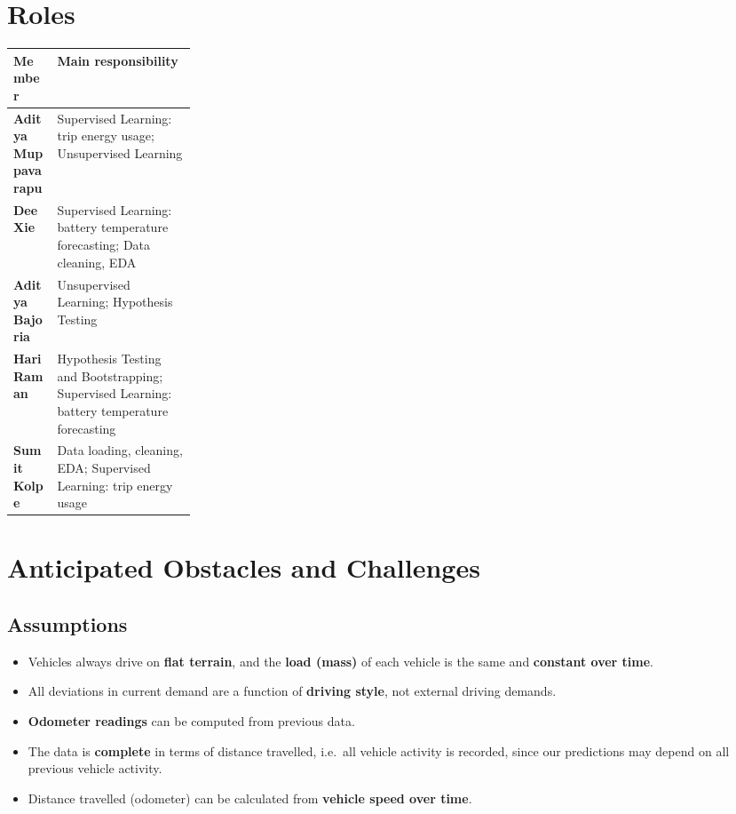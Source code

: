 \documentclass[11pt,letterpaper]{article}
\begin{document}
\section{Roles}

\begin{center}
\renewcommand{\arraystretch}{1.3}
\begin{tabularx}{\linewidth}{|>{\bfseries}p{0.24\linewidth}|>{\raggedright\arraybackslash}X|}
  \hline
  Member & \textbf{Main responsibility} \\
  \hline
  Aditya Muppavarapu & Supervised Learning: trip energy usage; Unsupervised Learning \\
  \hline
  Dee Xie & Supervised Learning: battery temperature forecasting; Data cleaning, EDA \\
  \hline
  Aditya Bajoria & Unsupervised Learning; Hypothesis Testing \\
  \hline
  Hari Raman & Hypothesis Testing and Bootstrapping; Supervised Learning: battery temperature forecasting \\
  \hline
  Sumit Kolpe & Data loading, cleaning, EDA; Supervised Learning: trip energy usage \\
  \hline
\end{tabularx}
\end{center}

\section{Anticipated Obstacles and Challenges}

\subsection{Assumptions}
\begin{itemize}
  \item Vehicles always drive on \textbf{flat terrain}, and the \textbf{load (mass)} of each vehicle is the same and \textbf{constant over time}.
  \item All deviations in current demand are a function of \textbf{driving style}, not external driving demands.
  \item \textbf{Odometer readings} can be computed from previous data.
  \item The data is \textbf{complete} in terms of distance travelled, i.e.\ all vehicle activity is recorded, since our predictions may depend on all previous vehicle activity.
  \item Distance travelled (odometer) can be calculated from \textbf{vehicle speed over time}.
\end{itemize}
\end{document}

